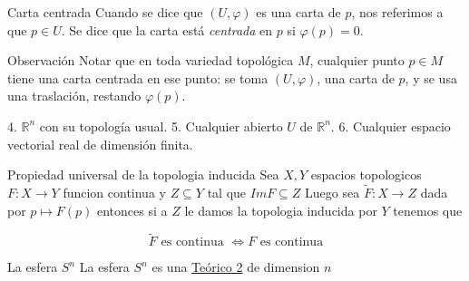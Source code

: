 \begin{bookdefinition}{Carta centrada}
Cuando se dice que $(U,\varphi)$ es una carta de $p$, nos referimos a que $p\in U$. Se dice que la carta está \emph{centrada} en $p$ si $\varphi(p)=0$.

\end{bookdefinition}
\begin{bookremark}{Observación}
Notar que en toda variedad topológica $M$, cualquier punto $p\in M$ tiene una carta centrada en ese punto: se toma $(U,\varphi)$, una carta de $p$, y se usa una traslación, restando $\varphi(p)$.

\end{bookremark}
\begin{bookexample}{}
4. $\mathbb{R}^n$ con su topología usual. 5. Cualquier abierto $U$ de $\mathbb{R}^n$. 6. Cualquier espacio vectorial real de dimensión finita.

\end{bookexample}
\begin{booklemma}{Propiedad universal de la topologia inducida}
Sea $X,Y$ espacios topologicos $F:X\rightarrow Y$ funcion continua y $Z\subseteq Y$ tal que $Im F\subseteq Z$ Luego sea $\tilde{F}:X\rightarrow Z$ dada por $p\mapsto F(p)$ entonces si a $Z$ le damos la topologia inducida por $Y$ tenemos que

\[
\tilde{F} \text{ es continua }\iff F \text{ es continua}
\]
\end{booklemma}
\label{blk:4a5257}
\begin{bookexample}{La esfera $S^n$}
La esfera $S^{n}$ es una \hyperref[blk:5bf2ca]{Teórico 2} de dimension $n$

\end{bookexample}
